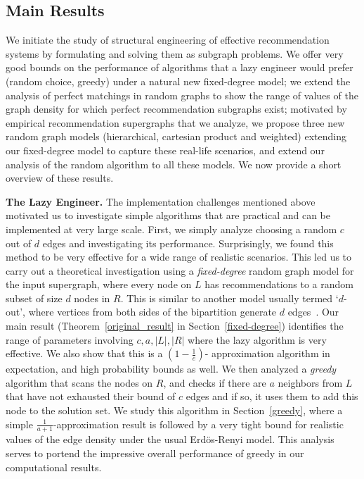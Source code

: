 \subsection{Main Results}
We initiate the study of structural engineering of effective
recommendation systems by formulating and solving them as subgraph
problems. We offer very good bounds on the performance of algorithms
that a lazy engineer would prefer (random choice, greedy) under a
natural new fixed-degree model; we extend the analysis of perfect
matchings in random graphs to show the range of values of the graph
density for which perfect recommendation subgraphs exist; motivated by
empirical recommendation supergraphs that we analyze, we propose three
new random graph models (hierarchical, cartesian product and weighted)
extending our fixed-degree model to capture these real-life scenarios,
and extend our analysis of the random algorithm to all these
models. We now provide a short overview of these results.

\noindent
{\bf The Lazy Engineer.} The implementation challenges mentioned above
motivated us to investigate simple algorithms that are practical and can
be implemented at very large scale. First, we simply analyze choosing a random
$c$ out of $d$ edges and investigating its performance.  Surprisingly,
we found this method to be very effective for a wide range of
realistic scenarios. This led us to carry out a theoretical
investigation using a {\em fixed-degree} random graph model for the
input supergraph, where every node on $L$ has recommendations to a
random subset of size $d$ nodes in $R$.  This is similar to another
model usually termed `$d$-out', where vertices from both sides of the
bipartition generate $d$ edges~\cite{FriezePittel2004}. Our main
result (Theorem~\ref{original_result} in Section~\ref{fixed-degree})
identifies the range of parameters involving $c,a,|L|, |R|$ where the
lazy algorithm is very effective. We also show that this is a
$(1-\frac1e)$- approximation algorithm in expectation, and high
probability bounds as well.  We then analyzed a {\em greedy} algorithm
that scans the nodes on $R$, and checks
if there are $a$ neighbors from $L$ that have not exhausted their
bound of $c$ edges and if so, it uses them to add
this node to the solution set. We study this algorithm in
Section~\ref{greedy}, where a simple $\frac{1}{a+1}$-approximation
result is followed by a very tight bound for realistic values of the
edge density under the usual Erd\"os-Renyi
model\cite{ErdosRenyi59}. This analysis serves to portend the
impressive overall performance of greedy in our computational
results. \vs

